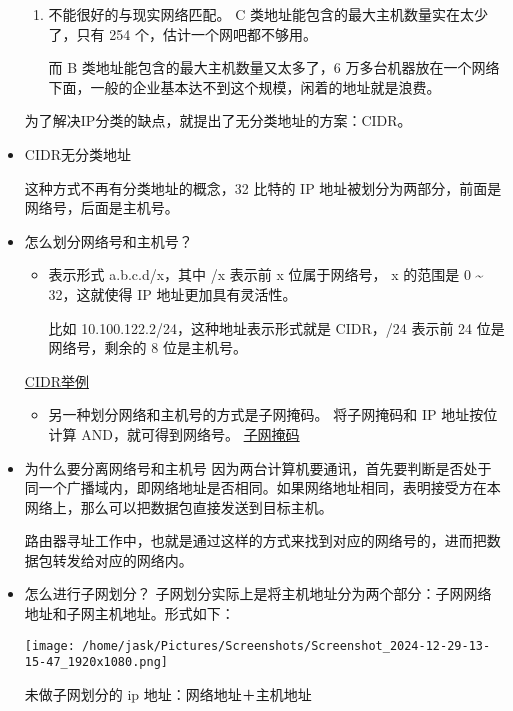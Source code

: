 \documentclass[11pt]{article}
\begin{document}
\begin{itemize}
\begin{enumerate}
\item 不能很好的与现实网络匹配。
C 类地址能包含的最大主机数量实在太少了，只有 254 个，估计一个网吧都不够用。

而 B 类地址能包含的最大主机数量又太多了，6 万多台机器放在一个网络下面，一般的企业基本达不到这个规模，闲着的地址就是浪费。
\end{enumerate}

为了解决IP分类的缺点，就提出了无分类地址的方案：CIDR。

\item CIDR无分类地址

这种方式不再有分类地址的概念，32 比特的 IP 地址被划分为两部分，前面是网络号，后面是主机号。

\item 怎么划分网络号和主机号？
\begin{itemize}
\item 表示形式 a.b.c.d/x，其中 /x 表示前 x 位属于网络号， x 的范围是 0 \textasciitilde{} 32，这就使得 IP 地址更加具有灵活性。

比如 10.100.122.2/24，这种地址表示形式就是 CIDR，/24 表示前 24 位是网络号，剩余的 8 位是主机号。
\end{itemize}
\href{file:///home/jask/Pictures/Screenshots/Screenshot\_2024-12-29-13-12-21\_1920x1080.png}{CIDR举例}

\begin{itemize}
\item 另一种划分网络和主机号的方式是子网掩码。
将子网掩码和 IP 地址按位计算 AND，就可得到网络号。
\href{file:///home/jask/Pictures/Screenshots/Screenshot\_2024-12-29-13-14-24\_1920x1080.png}{子网掩码}
\end{itemize}

\item 为什么要分离网络号和主机号
因为两台计算机要通讯，首先要判断是否处于同一个广播域内，即网络地址是否相同。如果网络地址相同，表明接受方在本网络上，那么可以把数据包直接发送到目标主机。

路由器寻址工作中，也就是通过这样的方式来找到对应的网络号的，进而把数据包转发给对应的网络内。

\item 怎么进行子网划分？
子网划分实际上是将主机地址分为两个部分：子网网络地址和子网主机地址。形式如下：
\begin{center}
\texttt{[image: /home/jask/Pictures/Screenshots/Screenshot\_2024-12-29-13-15-47\_1920x1080.png]}
\end{center}

未做子网划分的 ip 地址：网络地址＋主机地址


\end{itemize}
\end{document}
